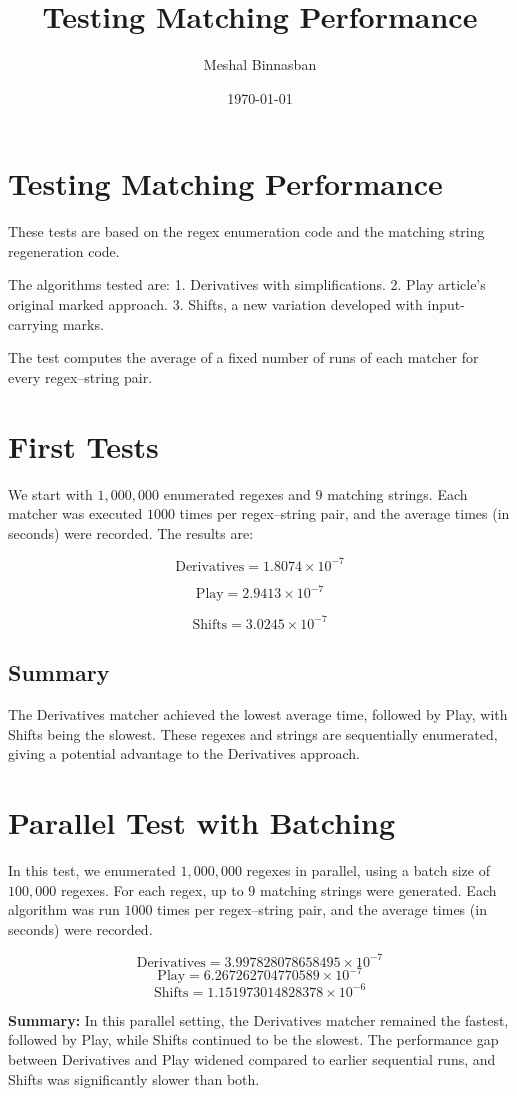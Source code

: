 \documentclass[12pt]{article}
\title{Testing Matching Performance}
\author{Meshal Binnasban}
\date{\today}
\begin{document}
\maketitle
\newpage

\section*{Testing Matching Performance}
These tests are based on the regex enumeration code and the matching string regeneration code.

The algorithms tested are:  
1. Derivatives with simplifications.  
2. Play article's original marked approach.  
3. Shifts, a new variation developed with input-carrying marks.

The test computes the average of a fixed number of runs of each matcher for every regex–string pair.

\section{First Tests}
We start with $1{,}000{,}000$ enumerated regexes and $9$ matching strings.  
Each matcher was executed $1000$ times per regex–string pair, and the average times  
(in seconds) were recorded. The results are:

\[ \text{Derivatives} = 1.8074 \times 10^{-7} \]

\[ \text{Play} = 2.9413 \times 10^{-7} \]

\[ \text{Shifts} = 3.0245 \times 10^{-7} \]

\subsection*{Summary}
The Derivatives matcher achieved the lowest average time, followed by Play, with Shifts being the slowest.  
These regexes and strings are sequentially enumerated, giving a potential advantage to the Derivatives approach.

\section{Parallel Test with Batching}
In this test, we enumerated $1{,}000{,}000$ regexes in parallel,  
using a batch size of $100{,}000$ regexes.  
For each regex, up to $9$ matching strings were generated.  
Each algorithm was run $1000$ times per regex--string pair,  
and the average times (in seconds) were recorded.

\[
\text{Derivatives} = 3.997828078658495 \times 10^{-7}
\]
\[
\text{Play} = 6.267262704770589 \times 10^{-7}
\]
\[
\text{Shifts} = 1.151973014828378 \times 10^{-6}
\]

\noindent
\textbf{Summary:} In this parallel setting, the Derivatives matcher remained the fastest,  
followed by Play, while Shifts continued to be the slowest.  
The performance gap between Derivatives and Play widened compared to earlier sequential runs,  
and Shifts was significantly slower than both.
\end{document}
